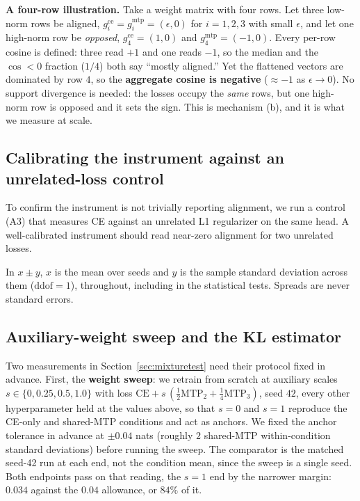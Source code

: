 \begin{tcolorbox}[colback=gray!5,colframe=gray!45,boxrule=0.4pt,left=4pt,right=4pt,
  top=3pt,bottom=3pt,fontupper=\small]
\textbf{A four-row illustration.} Take a weight matrix with four rows. Let three
low-norm rows be aligned, $g^{\text{ce}}_i=g^{\text{mtp}}_i=(\epsilon,0)$ for
$i=1,2,3$ with small $\epsilon$, and let one high-norm row be \emph{opposed},
$g^{\text{ce}}_4=(1,0)$ and $g^{\text{mtp}}_4=(-1,0)$. Every per-row cosine is
defined: three read $+1$ and one reads $-1$, so the median and the $\cos<0$
fraction ($1/4$) both say ``mostly aligned.'' Yet the flattened vectors are
dominated by row $4$, so the \textbf{aggregate cosine is negative}
($\approx -1$ as $\epsilon\to0$). No support divergence is needed: the losses
occupy the \emph{same} rows, but one high-norm row is opposed and it sets the
sign. This is mechanism (b), and it is what we measure at scale.
\end{tcolorbox}

\subsection{Calibrating the instrument against an unrelated-loss control}
\label{sec:calib}
To confirm the instrument is not trivially reporting alignment, we run a control
(A3) that measures CE against an unrelated L1 regularizer on the same head. A
well-calibrated instrument should read near-zero alignment for two unrelated
losses.

In $x \pm y$, $x$ is the mean over seeds and $y$ is the sample standard deviation
across them ($\mathrm{ddof}{=}1$), throughout, including in the statistical tests.
Spreads are never standard errors.

\subsection{Auxiliary-weight sweep and the KL estimator}
\label{sec:methodkl}
Two measurements in Section~\ref{sec:mixturetest} need their protocol fixed in
advance. First, the \textbf{weight sweep}: we retrain from scratch at auxiliary
scales $s \in \{0, 0.25, 0.5, 1.0\}$ with loss
$\mathrm{CE} + s\,(\tfrac{1}{2}\mathrm{MTP}_2 + \tfrac{1}{4}\mathrm{MTP}_3)$, seed
$42$, every other hyperparameter held at the values above, so that $s{=}0$ and
$s{=}1$ reproduce the CE-only and shared-MTP conditions and act as anchors. We
fixed the anchor tolerance in advance at $\pm0.04$ nats (roughly $2$ shared-MTP
within-condition standard deviations) before running the sweep. The comparator is
the matched seed-42 run at each end, not the condition mean, since the sweep is a
single seed. Both endpoints pass on that reading, the $s{=}1$ end by the narrower
margin: $0.034$ against the $0.04$ allowance, or $84\%$ of it.

